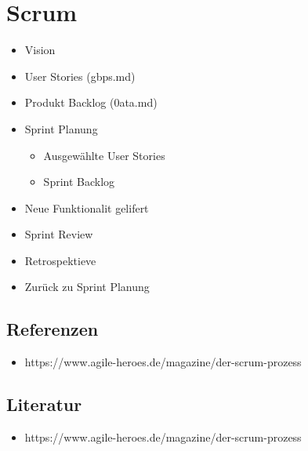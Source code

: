 \documentclass{sajzk}
\begin{document}
\section{Scrum} 
\label{dj7m}

\begin{itemize}
    \item Vision
    \item User Stories (gbps.md)
    \item Produkt Backlog (0ata.md)
    \item Sprint Planung
    \begin{itemize}
        \item Ausgewählte User Stories
        \item Sprint Backlog
    \end{itemize}
    \item Neue Funktionalit gelifert
    \item Sprint Review
    \item Retrospektieve
    \item Zurück zu Sprint Planung
\end{itemize}

\subsection{Referenzen} 
\begin{itemize}
    \item https://www.agile-heroes.de/magazine/der-scrum-prozess
\end{itemize}

\subsection{Literatur} 
\begin{itemize}
    \item https://www.agile-heroes.de/magazine/der-scrum-prozess
\end{itemize}
\end{document}
